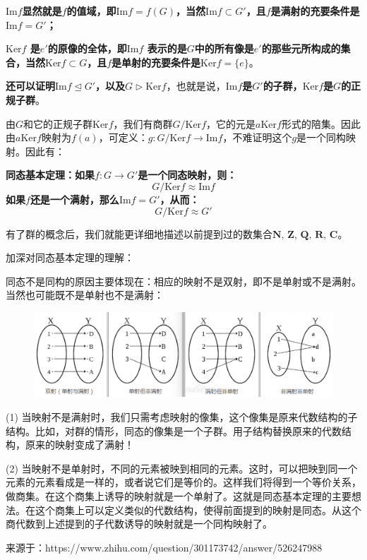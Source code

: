 \documentclass[12pt]{article}
\begin{document}
\textbf{$\text{Im} f$显然就是$f$的值域，即$\text{Im} f = f(G)$，当然$\text{Im} f \subset G'$，且$f$是满射的充要条件是$\text{Im} f = G'$；}

\textbf{$\text{Ker} f$ 是$e'$的原像的全体，即$\text{Im} f$ 表示的是$G$中的所有像是$e'$的那些元所构成的集合，当然$\text{Ker}f\subset G$，且$f$是单射的充要条件是$\text{Ker} f = \{e\} $}。

\textbf{还可以证明$\text{Im} f \unlhd G'$，以及$G \rhd \text{Ker} f$}，也就是说，\textbf{$\text{Im} f$是$G'$的子群，$\text{Ker} f$是$G$的正规子群}。

由$G$和它的正规子群$\text{Ker} f$，我们有商群$G/\text{Ker} f$，它的元是$a\text{Ker}f$形式的陪集。因此由$a\text{Ker}f$映射为$f(a)$，可定义：$g: G/\text{Ker} f \rightarrow \text{Im}f$，不难证明这个$g$是一个同构映射。因此有：
\begin{mdframed}[
linecolor=black!40,outerlinewidth=1pt,roundcorner=.5em,innertopmargin=1ex,innerbottommargin=.5\baselineskip,innerrightmargin=1em,innerleftmargin=1em,backgroundcolor=gray!5,
]
\textbf{同态基本定理：如果$f: G \rightarrow G'$是一个同态映射，则：}
$$
G/\text{Ker}f \approx \text{Im}f
$$
\textbf{如果$f$还是一个满射，那么$\text{Im} f = G'$，从而：}
$$
G/\text{Ker}f  \approx G'
$$
\end{mdframed}

有了群的概念后，我们就能更详细地描述以前提到过的数集合$\textbf{N, Z, Q, R, C}$。

\begin{framed}
加深对同态基本定理的理解：

同态不是同构的原因主要体现在：相应的映射不是双射，即不是单射或不是满射。当然也可能既不是单射也不是满射：
\begin{figure}[H]
    \centering
    \includegraphics[width=.8\textwidth]{fig/SetMappingClassification.png}
\end{figure}

(1) 当映射不是满射时，我们只需考虑映射的像集，这个像集是原来代数结构的子结构。比如，对群的情形，同态的像集是一个子群。用子结构替换原来的代数结构，原来的映射变成了满射！

(2) 当映射不是单射时，不同的元素被映到相同的元素。这时，可以把映到同一个元素的元素看成是一样的，或者说它们是等价的。这样我们将得到一个等价关系，做商集。在这个商集上诱导的映射就是一个单射了。这就是同态基本定理的主要想法。在这个商集上可以定义类似的代数结构，使得前面提到的映射是同态。从这个商代数到上述提到的子代数诱导的映射就是一个同构映射了。

来源于：https://www.zhihu.com/question/301173742/answer/526247988
\end{framed}
\end{document}
